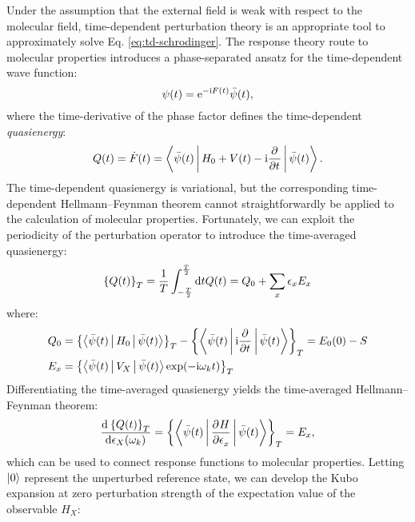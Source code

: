Under the assumption that the external field is weak with respect to the
molecular field, time-dependent perturbation theory is an appropriate
tool to approximately solve Eq. \eqref{eq:td-schrodinger}.
The response theory route to molecular properties introduces a
phase-separated ansatz for the time-dependent wave function:
\begin{equation}\label{eq:phase-separated}
  \psi(t) = \mathrm{e}^{-\mathrm{i}F(t)}\bar{\psi}(t),
\end{equation}
where the time-derivative of the phase factor defines the time-dependent
\emph{quasienergy}:\autocite{Christiansen1998-pe, Pawlowski2015-sq}
\begin{equation}
  Q(t) = \dot{F}(t) = \Braket{\bar{\psi}(t) |
  H_0 + V(t) - \mathrm{i}\frac{\partial^{}} {\partial t^{}}
  | \bar{\psi}(t)}.
\end{equation}
The time-dependent quasienergy is variational, but the corresponding
time-dependent Hellmann--Feynman theorem cannot straightforwardly be
applied to the calculation of molecular properties. Fortunately, we can exploit the
periodicity of the perturbation operator to introduce the time-averaged
quasienergy:
\begin{equation}
  \left\lbrace Q(t)\right\rbrace_T =
 \frac{1}{T} \int_{-\frac{T}{2}}^{\frac{T}{2}} \mathop{}\!\mathrm{d} t Q(t) =
 Q_0 + \sum_{x}\epsilon_x E_x
\end{equation}
where:
\begin{subequations}
 \begin{align}
  Q_0 &= \left\lbrace \Braket{\bar{\psi}(t) | H_0 | \bar{\psi}(t)} \right\rbrace_T
- \left\lbrace \Braket{\bar{\psi}(t) | \mathrm{i} \frac{\partial^{}} {\partial t^{}} | \bar{\psi}(t)}\right\rbrace_T = E_0(0) - S \\
  E_x &= \left\lbrace \Braket{\bar{\psi}(t) | V_X | \bar{\psi}(t)}\exp(-\mathrm{i}\omega_k t) \right\rbrace_T
 \end{align}
\end{subequations}
Differentiating the time-averaged quasienergy yields the time-averaged
Hellmann--Feynman theorem:
\begin{equation}\label{eq:tave-hellfeyn}
  \frac{\mathop{}\!\mathrm{d}^{}\left\lbrace Q(t)\right\rbrace_T}{\mathop{}\!\mathrm{d} \epsilon_X(\omega_k)^{}}
  =
  \left\lbrace\Braket{\bar{\psi}(t) | \frac{\partial^{}H} {\partial \epsilon_x^{}} | \bar{\psi}(t)}\right\rbrace_T
  = E_x,
\end{equation}
which can be used to connect response functions to molecular properties.
Letting $\ket{0}$ represent the unperturbed reference state, we can
develop the Kubo expansion at zero perturbation strength of the
expectation value of the observable $H_X$:\autocite{Kubo1957-ay}
